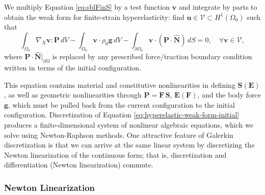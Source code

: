 We multiply Equation \ref{eq:sblFinS} by a test function $\mathbf v$ and integrate by parts to obtain the weak form for finite-strain hyperelasticity:
find $\mathbf u \in \mathcal V \subset H^1 \left( \Omega_0 \right)$ such that
\begin{equation}
    \int_{\Omega_0}{\nabla_X \mathbf{v} \!:\! \mathbf{P}} \, dV
    - \int_{\Omega_0}{\mathbf{v} \cdot \rho_0 \mathbf{g}} \, dV
    - \int_{\partial \Omega_0}{\mathbf{v} \cdot (\mathbf{P} \cdot \hat{\mathbf{N}})} \, dS
    = 0, \quad \forall \mathbf v \in \mathcal V,
   \label{eq:hyperelastic-weak-form-initial}
\end{equation}    
where $\mathbf{P} \cdot \hat{\mathbf{N}}|_{\partial\Omega}$ is replaced by any prescribed force/traction boundary condition written in terms of the initial configuration.

This equation contains material and constitutive nonlinearities in defining $\mathbf S \left( \mathbf E \right)$, as well as geometric nonlinearities through $\mathbf P = \mathbf F\, \mathbf S$, $\mathbf E \left( \mathbf F \right)$, and the body force $\mathbf g$, which must be pulled back from the current configuration to the initial configuration.
Discretization of Equation \ref{eq:hyperelastic-weak-form-initial} produces a finite-dimensional system of nonlinear algebraic equations, which we solve using Newton-Raphson methods.
One attractive feature of Galerkin discretization is that we can arrive at the same linear system by discretizing the Newton linearization of the continuous form; that is, discretization and differentiation (Newton linearization) commute.

\subsubsection{Newton Linearization}

